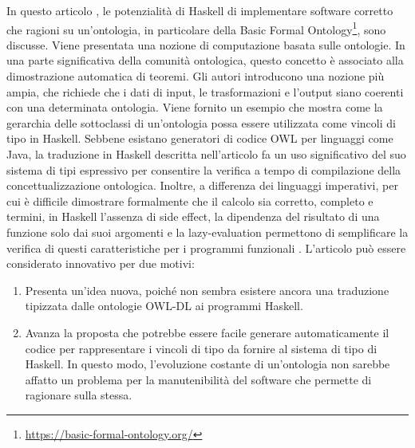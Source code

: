 In questo articolo \cite{verifiableontologybasedcomputation}, le potenzialità di Haskell di implementare software corretto che ragioni su un'ontologia, in particolare della Basic Formal Ontology\footnote{\url{https://basic-formal-ontology.org/}}, sono discusse. Viene presentata una nozione di computazione basata sulle ontologie. In una parte significativa della comunità ontologica, questo concetto è associato alla dimostrazione automatica di teoremi. Gli autori introducono una nozione più ampia, che richiede che i dati di input, le trasformazioni e l'output siano coerenti con una determinata ontologia. Viene fornito un esempio che mostra come la gerarchia delle sottoclassi di un'ontologia possa essere utilizzata come vincoli di tipo in Haskell. Sebbene esistano generatori di codice OWL per linguaggi come Java, la traduzione in Haskell descritta nell'articolo fa un uso significativo del suo sistema di tipi espressivo per consentire la verifica a tempo di compilazione della concettualizzazione ontologica. Inoltre, a differenza dei linguaggi imperativi, per cui è difficile dimostrare formalmente che il calcolo sia corretto, completo e termini, in Haskell l'assenza di side effect, la dipendenza del risultato di una funzione solo dai suoi argomenti e la lazy-evaluation permettono di semplificare la verifica di questi caratteristiche per i programmi funzionali \cite{hugheswhyFPMatters}. L'articolo può essere considerato innovativo per due motivi:
\begin{enumerate}
	\item Presenta un'idea nuova, poiché non sembra esistere ancora una traduzione tipizzata dalle ontologie OWL-DL ai programmi Haskell.
	\item Avanza la proposta che potrebbe essere facile generare automaticamente il codice per rappresentare i vincoli di tipo da fornire al sistema di tipo di Haskell. In questo modo, l'evoluzione costante di un'ontologia non sarebbe affatto un problema per la manutenibilità del software che permette di ragionare sulla stessa.
\end{enumerate}


